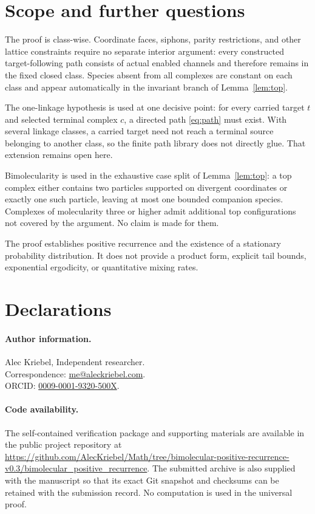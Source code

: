 \section{Scope and further questions}\label{sec:scope}

The proof is class-wise.  Coordinate faces, siphons, parity restrictions, and
other lattice constraints require no separate interior argument: every
constructed target-following path consists of actual enabled channels and
therefore remains in the fixed closed class.  Species absent from all
complexes are constant on each class and appear automatically in the
invariant branch of Lemma~\ref{lem:top}.

The one-linkage hypothesis is used at one decisive point: for every carried
target \(t\) and selected terminal complex \(c\), a directed path
\eqref{eq:path} must exist.  With several linkage classes, a carried target
need not reach a terminal source belonging to another class, so the finite
path library does not directly glue.  That extension remains open here.

Bimolecularity is used in the exhaustive case split of
Lemma~\ref{lem:top}: a top complex either contains two particles supported on
divergent coordinates or exactly one such particle, leaving at most one
bounded companion species.  Complexes of molecularity three or higher admit
additional top configurations not covered by the argument.  No claim is made
for them.

The proof establishes positive recurrence and the existence of a stationary
probability distribution.  It does not provide a product form, explicit tail
bounds, exponential ergodicity, or quantitative mixing rates.

\section*{Declarations}

\paragraph{Author information.}
Alec Kriebel, Independent researcher.\\
Correspondence: \mbox{\href{mailto:me@aleckriebel.com}{me@aleckriebel.com}}.\\
ORCID: \href{https://orcid.org/0009-0001-9320-500X}{0009-0001-9320-500X}.

\paragraph{Code availability.}
The self-contained verification package and supporting materials are
available in the public project repository at
\url{https://github.com/AlecKriebel/Math/tree/bimolecular-positive-recurrence-v0.3/bimolecular_positive_recurrence}.
The submitted archive is also supplied with the manuscript so that its exact
Git snapshot and checksums can be retained with the submission record.  No
computation is used in the universal proof.

